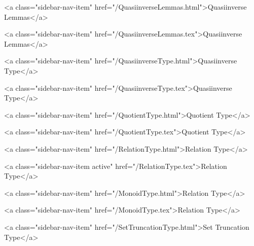       
    
      
        
          <a class="sidebar-nav-item" href="/QuasiinverseLemmas.html">Quasiinverse Lemmas</a>
        
      
    
      
        
          <a class="sidebar-nav-item" href="/QuasiinverseLemmas.tex">Quasiinverse Lemmas</a>
        
      
    
      
        
          <a class="sidebar-nav-item" href="/QuasiinverseType.html">Quasiinverse Type</a>
        
      
    
      
        
          <a class="sidebar-nav-item" href="/QuasiinverseType.tex">Quasiinverse Type</a>
        
      
    
      
        
          <a class="sidebar-nav-item" href="/QuotientType.html">Quotient Type</a>
        
      
    
      
        
          <a class="sidebar-nav-item" href="/QuotientType.tex">Quotient Type</a>
        
      
    
      
        
          <a class="sidebar-nav-item" href="/RelationType.html">Relation Type</a>
        
      
    
      
        
          <a class="sidebar-nav-item active" href="/RelationType.tex">Relation Type</a>
        
      
    
      
        
          <a class="sidebar-nav-item" href="/MonoidType.html">Relation Type</a>
        
      
    
      
        
          <a class="sidebar-nav-item" href="/MonoidType.tex">Relation Type</a>
        
      
    
      
        
          <a class="sidebar-nav-item" href="/SetTruncationType.html">Set Truncation Type</a>
        
